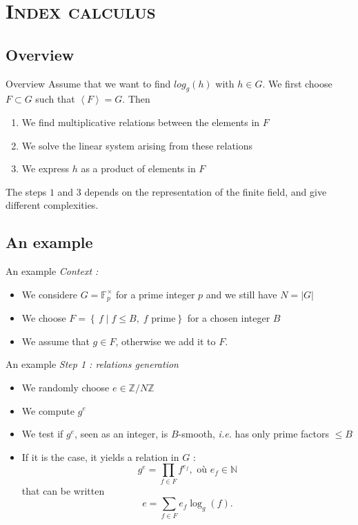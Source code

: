 \documentclass[xcolor=x11names,compress]{beamer}
\theoremstyle{break}
\theoremstyle{sc}
\theoremstyle{definition}
\theoremstyle{remark}
\newcommand{\ie}{\emph{i.e. }}
\begin{document}
\section{\scshape Index calculus}
\subsection{Overview}
\begin{frame}{Overview}
  Assume that we want to find $log_g(h)$ with $h\in G$. We first choose $F\subset
  G$ such that $\left\langle F \right\rangle = G$. Then
  \begin{enumerate}
    \item We find multiplicative relations between the elements in $F$
    \item We solve the linear system arising from these relations
    \item We express $h$ as a product of elements in $F$
  \end{enumerate}
  The steps $1$ and $3$ depends on the representation of the finite field, and
  give different complexities.
\end{frame}

\subsection{An example}
\begin{frame}{An example}
  \emph{Context :}
  \begin{itemize}
    \item We considere $G = \mathbb{F}_p^\times$ for a prime integer $p$ and we
      still have $N = |G|$
    \item We choose $F = \left\{\, f \;|\; f \leq B,\; f \text{ prime}
    \right\}$ for a chosen integer $B$
  \item We assume that $g\in F$, otherwise we add it to $F$.
  \end{itemize}
\end{frame}

\begin{frame}{An example}
  \emph{Step 1 : relations generation}
  \begin{itemize}
    \item We randomly choose $e\in \mathbb{Z}/N\mathbb{Z}$
    \item We compute $g^e$
    \item We test if $g^e$, seen as an integer, is $B$-smooth, \ie has only
      prime factors $\leq B$
    \item If it is the case, it yields a relation in $G$ :
      \[ 
        g^e = \prod_{f\in F}f^{e_f}, \text{ où } e_f\in \mathbb{N}
      \]
      that can be written
      \[
        e = \sum_{f\in F}e_f\log_g(f).
      \]
  \end{itemize}
\end{frame}
\end{document}
